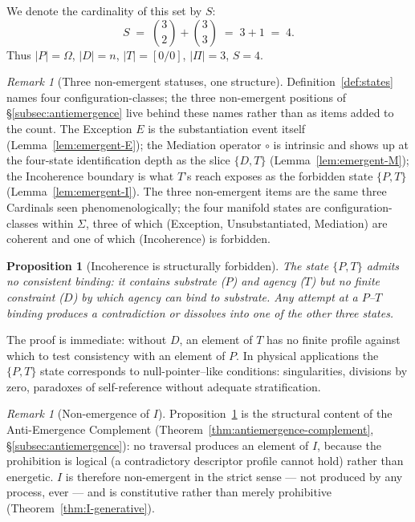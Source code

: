 \documentclass[11pt,a4paper]{article}
\newtheorem{proposition}[theorem]{Proposition}
\theoremstyle{definition}
\theoremstyle{remark}
\newtheorem{remark}[theorem]{Remark}
\begin{document}
We denote the cardinality of this set by $S$:
\begin{equation}
S \;=\; \binom{3}{2}+\binom{3}{3} \;=\; 3+1 \;=\; 4.
\label{eq:S}
\end{equation}
Thus $|P|=\Omega$, $|D|=n$, $|T|=[0/0]$, $|\Pi|=3$, $S=4$.

\begin{remark}[Three non-emergent statuses, one structure]\label{rem:states-nonemergent}
Definition~\ref{def:states} names four configuration-classes; the three non-emergent positions of \S\ref{subsec:antiemergence} live behind these names rather than as items added to the count. The Exception $E$ is the substantiation event itself (Lemma~\ref{lem:emergent-E}); the Mediation operator $\circ$ is intrinsic and shows up at the four-state identification depth as the slice $\{D,T\}$ (Lemma~\ref{lem:emergent-M}); the Incoherence boundary is what $T$'s reach exposes as the forbidden state $\{P,T\}$ (Lemma~\ref{lem:emergent-I}). The three non-emergent items are the same three Cardinals seen phenomenologically; the four manifold states are configuration-classes within $\Sigma$, three of which (Exception, Unsubstantiated, Mediation) are coherent and one of which (Incoherence) is forbidden.
\end{remark}

\begin{proposition}[Incoherence is structurally forbidden]\label{prop:incoherence}
The state $\{P,T\}$ admits no consistent binding: it contains substrate ($P$) and agency ($T$) but no finite constraint ($D$) by which agency can bind to substrate. Any attempt at a $P$--$T$ binding produces a contradiction or dissolves into one of the other three states.
\end{proposition}

The proof is immediate: without $D$, an element of $T$ has no finite profile against which to test consistency with an element of $P$. In physical applications the $\{P,T\}$ state corresponds to null-pointer--like conditions: singularities, divisions by zero, paradoxes of self-reference without adequate stratification.

\begin{remark}[Non-emergence of $I$]\label{rem:I-nonemergent}
Proposition~\ref{prop:incoherence} is the structural content of the Anti-Emergence Complement (Theorem~\ref{thm:antiemergence-complement}, \S\ref{subsec:antiemergence}): no traversal produces an element of $I$, because the prohibition is logical (a contradictory descriptor profile cannot hold) rather than energetic. $I$ is therefore non-emergent in the strict sense --- not produced by any process, ever --- and is constitutive rather than merely prohibitive (Theorem~\ref{thm:I-generative}).
\end{remark}
\end{document}
